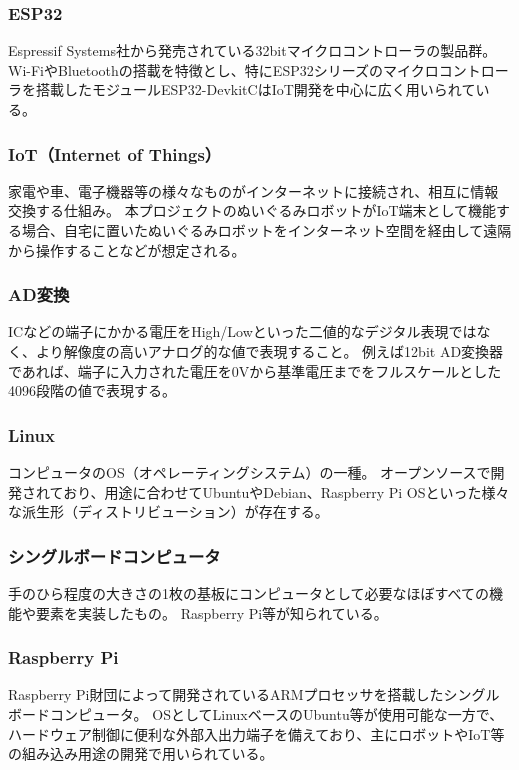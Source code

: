 \documentclass[uplatex,a4paper,12pt]{jsarticle}
\begin{document}
\subsubsection*{ESP32 \label{term:esp32}}
Espressif Systems社から発売されている32bitマイクロコントローラの製品群。
Wi-FiやBluetoothの搭載を特徴とし、特にESP32シリーズのマイクロコントローラを搭載したモジュールESP32-DevkitCはIoT開発を中心に広く用いられている。

\subsubsection*{IoT（Internet of Things） \label{term:iot}}
家電や車、電子機器等の様々なものがインターネットに接続され、相互に情報交換する仕組み。
本プロジェクトのぬいぐるみロボットがIoT端末として機能する場合、自宅に置いたぬいぐるみロボットをインターネット空間を経由して遠隔から操作することなどが想定される。


\subsubsection*{AD変換 \label{term:adc}}
ICなどの端子にかかる電圧をHigh/Lowといった二値的なデジタル表現ではなく、より解像度の高いアナログ的な値で表現すること。
例えば12bit AD変換器であれば、端子に入力された電圧を0Vから基準電圧までをフルスケールとした4096段階の値で表現する。

\subsubsection*{Linux \label{term:linux}}
コンピュータのOS（オペレーティングシステム）の一種。
オープンソースで開発されており、用途に合わせてUbuntuやDebian、Raspberry Pi OSといった様々な派生形（ディストリビューション）が存在する。


\subsubsection*{シングルボードコンピュータ \label{term:sbc}}
手のひら程度の大きさの1枚の基板にコンピュータとして必要なほぼすべての機能や要素を実装したもの。
Raspberry Pi等が知られている。

\subsubsection*{Raspberry Pi \label{term:raspi}}
Raspberry Pi財団によって開発されているARMプロセッサを搭載したシングルボードコンピュータ。
OSとしてLinuxベースのUbuntu等が使用可能な一方で、ハードウェア制御に便利な外部入出力端子を備えており、主にロボットやIoT等の組み込み用途の開発で用いられている。
\end{document}
